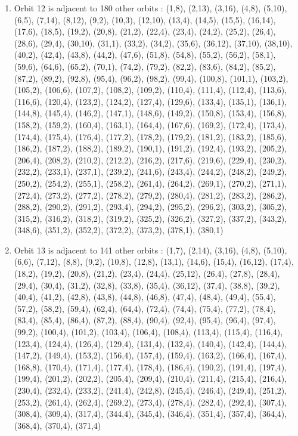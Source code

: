 \documentclass[12pt]{article}
\begin{document}
\begin{enumerate}
\item Orbit 12 is adjacent to 180 other orbits : (1,8), (2,13), (3,16), (4,8), (5,10), (6,5), (7,14), (8,12), (9,2), (10,3), (12,10), (13,4), (14,5), (15,5), (16,14), (17,6), (18,5), (19,2), (20,8), (21,2), (22,4), (23,4), (24,2), (25,2), (26,4), (28,6), (29,4), (30,10), (31,1), (33,2), (34,2), (35,6), (36,12), (37,10), (38,10), (40,2), (42,4), (43,8), (44,2), (47,6), (51,8), (54,8), (55,2), (56,2), (58,1), (59,6), (64,6), (65,2), (70,1), (74,2), (79,2), (82,2), (83,6), (84,2), (85,2), (87,2), (89,2), (92,8), (95,4), (96,2), (98,2), (99,4), (100,8), (101,1), (103,2), (105,2), (106,6), (107,2), (108,2), (109,2), (110,4), (111,4), (112,4), (113,6), (116,6), (120,4), (123,2), (124,2), (127,4), (129,6), (133,4), (135,1), (136,1), (144,8), (145,4), (146,2), (147,1), (148,6), (149,2), (150,8), (153,4), (156,8), (158,2), (159,2), (160,4), (163,1), (164,4), (167,6), (169,2), (172,4), (173,4), (174,4), (175,4), (176,4), (177,2), (178,2), (179,2), (181,2), (183,2), (185,6), (186,2), (187,2), (188,2), (189,2), (190,1), (191,2), (192,4), (193,2), (205,2), (206,4), (208,2), (210,2), (212,2), (216,2), (217,6), (219,6), (229,4), (230,2), (232,2), (233,1), (237,1), (239,2), (241,6), (243,4), (244,2), (248,2), (249,2), (250,2), (254,2), (255,1), (258,2), (261,4), (264,2), (269,1), (270,2), (271,1), (272,4), (273,2), (277,2), (278,2), (279,2), (280,4), (281,2), (283,2), (286,2), (288,2), (290,2), (291,2), (293,4), (294,2), (295,2), (296,2), (303,2), (305,2), (315,2), (316,2), (318,2), (319,2), (325,2), (326,2), (327,2), (337,2), (343,2), (348,6), (351,2), (352,2), (372,2), (373,2), (378,1), (380,1)
\item Orbit 13 is adjacent to 141 other orbits : (1,7), (2,14), (3,16), (4,8), (5,10), (6,6), (7,12), (8,8), (9,2), (10,8), (12,8), (13,1), (14,6), (15,4), (16,12), (17,4), (18,2), (19,2), (20,8), (21,2), (23,4), (24,4), (25,12), (26,4), (27,8), (28,4), (29,4), (30,4), (31,2), (32,8), (33,8), (35,4), (36,12), (37,4), (38,8), (39,2), (40,4), (41,2), (42,8), (43,8), (44,8), (46,8), (47,4), (48,4), (49,4), (55,4), (57,2), (58,2), (59,4), (62,4), (64,4), (72,4), (74,4), (75,4), (77,2), (78,4), (83,4), (85,4), (86,4), (87,2), (88,4), (90,4), (92,4), (95,4), (96,4), (97,4), (99,2), (100,4), (101,2), (103,4), (106,4), (108,4), (113,4), (115,4), (116,4), (123,4), (124,4), (126,4), (129,4), (131,4), (132,4), (140,4), (142,4), (144,4), (147,2), (149,4), (153,2), (156,4), (157,4), (159,4), (163,2), (166,4), (167,4), (168,8), (170,4), (171,4), (177,4), (178,4), (186,4), (190,2), (191,4), (197,4), (199,4), (201,2), (202,2), (205,4), (209,4), (210,4), (211,4), (215,4), (216,4), (230,4), (232,4), (233,2), (241,4), (242,8), (245,4), (246,4), (249,4), (251,2), (253,2), (261,4), (262,4), (269,2), (273,4), (278,4), (282,4), (292,4), (307,4), (308,4), (309,4), (317,4), (344,4), (345,4), (346,4), (351,4), (357,4), (364,4), (368,4), (370,4), (371,4)

\end{enumerate}
\end{document}
